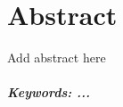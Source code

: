 \chapter*{Abstract}
\thispagestyle{empty}

Add abstract here

\vspace{50pt}



\paragraph{Keywords: ...} 


